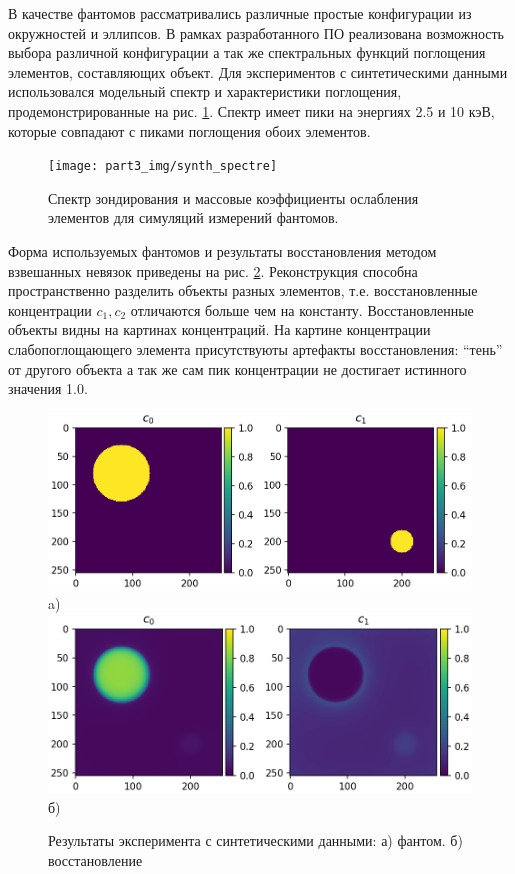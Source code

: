 В качестве фантомов рассматривались различные простые конфигурации из окружностей и эллипсов.
В рамках разработанного ПО реализована возможность выбора различной конфигурации а так же спектральных функций поглощения элементов, составляющих объект.
Для экспериментов с синтетическими данными использовался модельный спектр и характеристики поглощения, продемонстрированные на рис. \ref{fig:synth_spectrum}.
Спектр имеет пики на энергиях 2.5 и 10 кэВ, которые совпадают с пиками поглощения обоих элементов.

\begin{figure}
\centering
\texttt{[image: part3\_img/synth\_spectre]}

\caption{Спектр зондирования и массовые коэффициенты ослабления элементов для симуляций измерений фантомов.}
\label{fig:synth_spectrum}
\end{figure}

Форма используемых фантомов и результаты восстановления методом взвешанных невязок приведены на рис. \ref{fig:synth_recon}.
Реконструкция способна пространственно разделить объекты разных элементов, т.е. восстановленные концентрации $c_1, c_2$ отличаются больше чем на константу.
Восстановленные объекты видны на картинах концентраций.
На картине концентрации слабопоглощающего элемента присутствуюты артефакты восстановления: ``тень'' от другого объекта а так же сам пик концентрации не достигает истинного значения 1.0.

\begin{figure}
\centering
\includegraphics[width=\textwidth]{../Presentation/images/0999}
\\
a)
\\
\includegraphics[width=\textwidth]{../Presentation/images/whiterec_res}
\\
б)
\\
\caption{Результаты эксперимента с синтетическими данными: а) фантом. б) восстановление}


\label{fig:synth_recon}
\end{figure}

